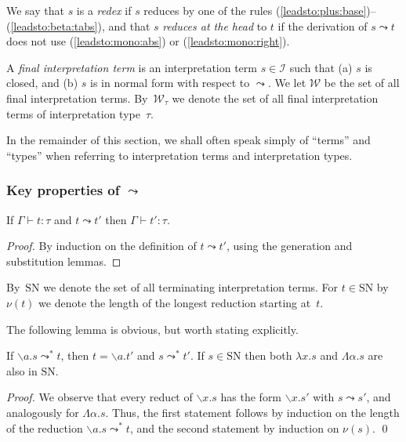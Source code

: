 \documentclass[runningheads,a4paper]{llncs}
\newcommand{\Iterms}{\mathcal{I}}
\newcommand{\World}{\mathcal{W}}
\newcommand{\abs}[2]{\lambda #1.#2}
\newcommand{\tabs}[2]{\Lambda #1.#2}
\newcommand{\abstraction}[2]{\backslash #1.#2}
\newcommand{\SN}{\mathrm{SN}}
\begin{document}
\begin{definition}
  We say that $s$ is a \emph{redex} if $s$ reduces by one of the rules
  (\ref{leadsto:plus:base})--(\ref{leadsto:beta:tabs}), and that $s$
  \emph{reduces at the head} to $t$ if the derivation of
  $s \leadsto t$ does not use (\ref{leadsto:mono:abs}) or
  (\ref{leadsto:mono:right}).

  A \emph{final interpretation term} is an interpretation term
  $s \in \Iterms$ such that (a) $s$ is closed, and (b) $s$ is in
  normal form with respect to $\leadsto$.  We let $\World$ be the set
  of all final interpretation terms. By~$\World_\tau$ we denote the
  set of all final interpretation terms of interpretation type~$\tau$.
\end{definition}

In the remainder of this section, we shall often speak simply of
``terms'' and ``types'' when referring to interpretation terms and
interpretation types.

\subsubsection{Key properties of $\leadsto$}

\begin{lemma}
  If $\Gamma \vdash t : \tau$ and $t \leadsto t'$ then
  $\Gamma \vdash t' : \tau$.
\end{lemma}

\begin{proof}
  By induction on the definition of $t \leadsto t'$, using the
  generation and substitution lemmas.
\end{proof}

By~$\SN$ we denote the set of all terminating interpretation
terms. For $t \in \SN$ by~$\nu(t)$ we denote the length of the longest
reduction starting at~$t$.

The following lemma is obvious, but worth stating explicitly.

\begin{lemma}\label{lem_reduce_abs}
  If $\abstraction{a}{s} \leadsto^* t$, then $t = \abstraction{a}{t'}$
  and $s \leadsto^* t'$.  If $s \in \SN$ then both $\abs{x}{s}$ and
  $\tabs{\alpha}{s}$ are also in $\SN$.
\end{lemma}

\begin{proof}
  We observe that every reduct of $\abstraction{x}{s}$ has the form
  $\abstraction{x}{s'}$ with $s \leadsto s'$, and analogously for
  $\tabs{\alpha}{s}$.  Thus, the first statement follows by induction
  on the length of the reduction $\abstraction{a}{s} \leadsto^* t$,
  and the second statement by induction on $\nu(s)$.  \qed
\end{proof}
\end{document}
